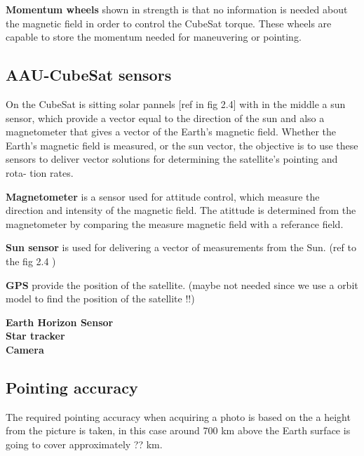 %
\textbf{Momentum wheels} shown in  strength is that no information is needed about the magnetic field in order to control the CubeSat torque. These wheels are capable to store the momentum needed for maneuvering or pointing.
%
\subsection{AAU-CubeSat sensors}
On the CubeSat is sitting solar pannels [ref in fig 2.4] with in the middle a sun sensor, which provide a vector equal to the direction of the sun and also a magnetometer that gives a vector of the Earth's magnetic field. Whether the Earth’s magnetic field is measured, or the sun vector, the objective is to use these sensors to deliver vector solutions for determining the satellite’s pointing and rota- tion rates.

\textbf{Magnetometer} is a sensor used for attitude control, which measure the direction and intensity of the magnetic field. The atittude is determined from the magnetometer by comparing the measure magnetic field with a referance field.

\textbf{Sun sensor} is used for delivering a vector of measurements from the Sun. (ref to the fig 2.4 )

\textbf{GPS} provide the position of the satellite. (maybe not needed since we use a orbit model to find the position of the satellite !!)

\textbf{Earth Horizon Sensor } \\
\textbf{Star tracker}\\
\textbf{Camera}
%
\subsection{Pointing accuracy}
The required pointing accuracy when acquiring a photo is based on the a height from the picture is taken, in this case around 700 km above the Earth surface is going to cover approximately ?? km. 



